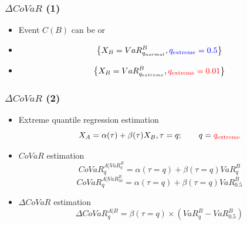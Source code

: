 \documentclass[aspectratio=43,dvipsnames,usenames, svgnames]{beamer}
\begin{document}
\begin{frame} %
\frametitle{$\Delta CoVaR$ (1)}
\begin{itemize}
	\item Event $C(B)$ can be \textbf{{\color{blue}{normal}}} or \textbf{{\color{red}{extreme}}}
	\smallskip
	\item {\colorbox{blue}{}}
	\begin{equation*}
		\left\{X_B = VaR_{q_{normal}}^B, {\color{blue}{q_\text{extreme} = 0.5}} \right\}
	\end{equation*}
	\item {\colorbox{red}{\color{white}{Extreme event}}}
	\begin{equation*}
		\left\{X_B = VaR_{q_{extreme}}^B, {\color{red}{q_\text{extreme} = 0.01}} \right\}
	\end{equation*}
	\smallskip
	\begin{center}
	\end{center}
\end{itemize}
\end{frame}

\begin{frame} %
\frametitle{$\Delta CoVaR$ (2)}
\begin{itemize}
	\item Extreme quantile regression estimation
	\begin{equation*}
		X_A = \alpha(\tau) + \beta(\tau) X_B, \tau = q; \hspace{2em}  q={\color{red} q_\text{extreme}}
	\end{equation*}
	\item $CoVaR$ estimation
	\begin{equation*}
		CoVaR_q^{A|\textit{VaR}_q^B} = \alpha(\tau=q) + \beta(\tau=q)\textit{VaR}_q^B
	\end{equation*}
	\begin{equation*}
		CoVaR_{q}^{A|\textit{VaR}_{50}^B} = \alpha(\tau=q) + \beta(\tau=q)\textit{VaR}_{0.5}^B
	\end{equation*}
	\item $\Delta CoVaR$ estimation
	\begin{equation*}
		\Delta CoVaR_{q}^{A|B} = \beta(\tau=q) \times \left( VaR_{q}^B - VaR_{0.5}^B \right)
	\end{equation*}
\end{itemize}
\end{frame}
\end{document}
